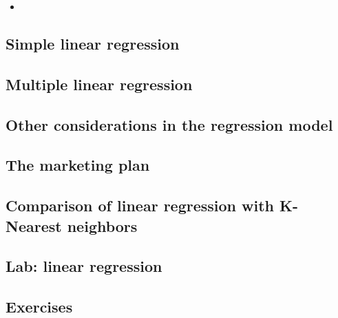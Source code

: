 \begin{itemize}
	\item
 \end{itemize}
\subsection{Simple linear regression}

\subsection{Multiple linear regression}

\subsection{Other considerations in the regression model}

\subsection{The marketing plan}

\subsection{Comparison of linear regression with K-Nearest neighbors}

\subsection{Lab: linear regression}

\subsection{Exercises}


